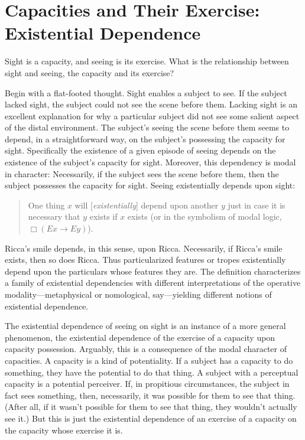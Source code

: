 \documentclass[12pt]{article}
\begin{document}


\section{Capacities and Their Exercise: Existential Dependence} %
\label{sec:capacities_and_their_exercise}

Sight is a capacity, and seeing is its exercise. What is the relationship between sight and seeing, the capacity and its exercise?

Begin with a flat-footed thought. Sight enables a subject to see. If the subject lacked sight, the subject could not see the scene before them. Lacking sight is an excellent explanation for why a particular subject did not see some salient aspect of the distal environment. The subject's seeing the scene before them seems to depend, in a straightforward way, on the subject's possessing the capacity for sight. Specifically the existence of a given episode of seeing depends on the existence of the subject's capacity for sight. Moreover, this dependency is modal in character: Necessarily, if the subject sees the scene before them, then the subject possesses the capacity for sight. Seeing existentially depends upon sight:
\begin{quote}
    One thing \( x \) will [\emph{existentially}] depend upon another \( y \) just in case it is necessary that \( y \) exists if \( x \) exists (or in the symbolism of modal logic, \( \Box(Ex \rightarrow Ey) \)). \citep[270]{Fine:1995ls} 
\end{quote}
Ricca's smile depends, in this sense, upon Ricca. Necessarily, if Ricca's smile exists, then so does Ricca. Thus particularized features or tropes existentially depend upon the particulars whose features they are. The definition characterizes a family of existential dependencies with different interpretations of the operative modality---metaphysical or nomological, say---yielding different notions of existential dependence. 

The existential dependence of seeing on sight is an instance of a more general phenomenon, the existential dependence of the exercise of a capacity upon capacity possession. Arguably, this is a consequence of the modal character of capacities. A capacity is a kind of potentiality. If a subject has a capacity to do something, they have the potential to do that thing. A subject with a perceptual capacity is a potential perceiver. If, in propitious circumstances, the subject in fact sees something, then, necessarily, it was possible for them to see that thing. (After all, if it wasn't possible for them to see that thing, they wouldn't actually see it.) But this is just the existential dependence of an exercise of a capacity on the capacity whose exercise it is.
\end{document}
